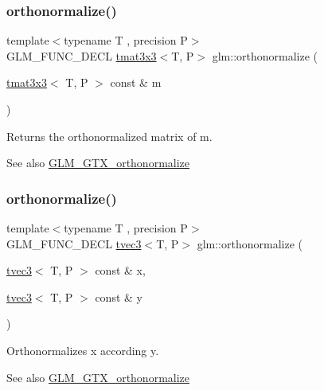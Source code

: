 \subsubsection{\texorpdfstring{orthonormalize()}{orthonormalize()}\hspace{0.1cm}{\footnotesize\ttfamily [1/2]}}
{\footnotesize\ttfamily template$<$typename T , precision P$>$ \\
G\+L\+M\+\_\+\+F\+U\+N\+C\+\_\+\+D\+E\+CL \hyperlink{structglm_1_1tmat3x3}{tmat3x3}$<$T, P$>$ glm\+::orthonormalize (\begin{DoxyParamCaption}\item[{\hyperlink{structglm_1_1tmat3x3}{tmat3x3}$<$ T, P $>$ const \&}]{m }\end{DoxyParamCaption})}

Returns the orthonormalized matrix of m.

\begin{DoxySeeAlso}{See also}
\hyperlink{group__gtx__orthonormalize}{G\+L\+M\+\_\+\+G\+T\+X\+\_\+orthonormalize} 
\end{DoxySeeAlso}
\mbox{\label{group__gtx__orthonormalize_gad7afff30d7323fdc7aed7f5a16a0c596}} 
\subsubsection{\texorpdfstring{orthonormalize()}{orthonormalize()}\hspace{0.1cm}{\footnotesize\ttfamily [2/2]}}
{\footnotesize\ttfamily template$<$typename T , precision P$>$ \\
G\+L\+M\+\_\+\+F\+U\+N\+C\+\_\+\+D\+E\+CL \hyperlink{structglm_1_1tvec3}{tvec3}$<$T, P$>$ glm\+::orthonormalize (\begin{DoxyParamCaption}\item[{\hyperlink{structglm_1_1tvec3}{tvec3}$<$ T, P $>$ const \&}]{x,  }\item[{\hyperlink{structglm_1_1tvec3}{tvec3}$<$ T, P $>$ const \&}]{y }\end{DoxyParamCaption})}

Orthonormalizes x according y.

\begin{DoxySeeAlso}{See also}
\hyperlink{group__gtx__orthonormalize}{G\+L\+M\+\_\+\+G\+T\+X\+\_\+orthonormalize} 
\end{DoxySeeAlso}
